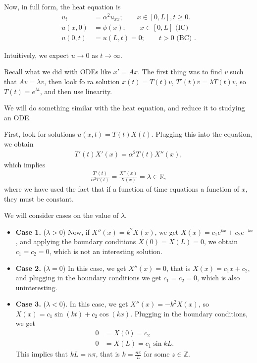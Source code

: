 \documentclass{article}
\newcommand{\RR}{\mathbb{R}}
\newcommand{\ZZ}{\mathbb{Z}}
\begin{document}
Now, in full form, the heat equation is
\begin{align*}
  u_t &= \alpha^2 u_{xx}; \qquad x \in [0, L], t \geq 0. \\
  u(x, 0) &= \phi(x); \qquad x \in [0, L] \text{ (IC) } \\
  u(0, t) &= u(L, t) = 0; \qquad t > 0 \text{ (BC) }.
\end{align*}

Intuitively, we expect $u \to 0$ as $t \to \infty$.

Recall what we did with ODEs like $x' = Ax$.  The first thing was to find $v$ such that $Av = \lambda v$, then look fo ra solution $x(t) = T(t) v$, $T'(t) v = \lambda T(t) v$, so $T(t) = e^{\lambda t}$, and then use linearity.

We will do something similar with the heat equation, and reduce it to studying an ODE.

First, look for solutions $u(x, t) = T(t) X(t)$.  Plugging this into the equation, we obtain
\begin{align*}
  T'(t) X'(x) = \alpha^2 T(t) X''(x),
\end{align*}
which implies
\begin{align*}
  \frac{T'(t)}{\alpha^2 T(t)} = \frac{X''(x)}{X(x)} = \lambda \in \RR,
\end{align*}
where we have used the fact that if a function of time equations a function of $x$, they must be constant.

We will consider cases on the value of $\lambda$.

\begin{itemize}
  \item {\bf Case 1.} ($\lambda > 0$) Now, if $X''(x) = k^2 X(x)$, we get $X(x) = c_1 e^{k x} + c_2 e^{-kx}$, and  applying the boundary conditions $X(0) = X(L) = 0$, we obtain $c_1 = c_2 = 0$, which is not an interesting solution.
  \item {\bf Case 2.} ($\lambda = 0$) In this case, we get $X''(x) = 0$, that is $X(x) = c_1 x + c_2$, and plugging in the boundary conditions we get $c_1 = c_2 = 0$, which is also uninteresting.
  \item {\bf Case 3.} ($\lambda < 0$).   In this case, we get $X''(x) = - k^2 X(x)$, so $X(x) = c_1 \sin (k t) + c_2 \cos (kx)$.  Plugging in the boundary conditions, we get
    \begin{align*}
      0 &= X(0) = c_2 \\
      0 &= X(L) =  c_1 \sin kL.
    \end{align*}
    This implies that $kL = n \pi$, that is $k = \frac{n \pi }{L}$ for some $z \in \ZZ$.
\end{itemize}
\end{document}
